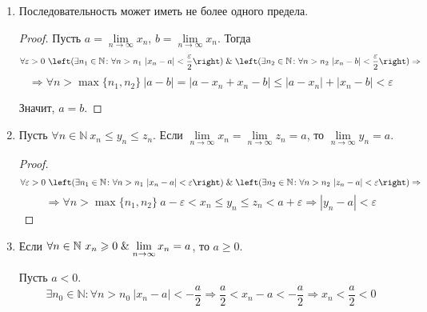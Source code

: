 \begin{enumerate}
	\item Последовательность может иметь не более одного предела.
	\begin{proof}
	Пусть $a = \lim\limits_{n \to \infty} x_n$, $b = \lim\limits_{n \to \infty} x_n$.
	Тогда
	\begin{equation*}
	\forall \varepsilon > 0 \
	\left( \exists n_1 \in \mathbb N \colon \forall n > n_1 \ |x_n - a| < \frac\varepsilon2 \right) \lAnd
	\left( \exists n_2 \in \mathbb N \colon \forall n > n_2 \ |x_n - b| < \frac\varepsilon2 \right) \Rightarrow
	\end{equation*}
	\begin{equation*}
	\Rightarrow \forall n > \max \{ n_1, n_2 \} \ |a - b| = |a - x_n + x_n - b| \leqslant |a - x_n| + |x_n - b| < \varepsilon
	\end{equation*}
	
	Значит, $a = b$.
	\end{proof}
	
	\item {}
	\begin{theorem}
	Пусть $\forall n \in \mathbb N \ x_n \leqslant y_n \leqslant z_n$.
	Если $\lim\limits_{n \to \infty} x_n = \lim\limits_{n \to \infty} z_n = a$, то $\lim\limits_{n \to \infty} y_n = a$.
	\end{theorem}
	\begin{proof}
	\begin{equation*}
	\forall \varepsilon > 0 \
	\left( \exists n_1 \in \mathbb N \colon \forall n > n_1 \ |x_n - a| < \varepsilon \right) \lAnd
	\left( \exists n_2 \in \mathbb N \colon \forall n > n_2 \ |z_n - a| < \varepsilon \right) \Rightarrow
	\end{equation*}
	\begin{equation*}
	\Rightarrow \forall n > \max \{ n_1, n_2 \} \ a - \varepsilon < x_n \leqslant y_n \leqslant z_n < a + \varepsilon \Rightarrow |y_n - a| < \varepsilon
	\end{equation*}
	\end{proof}
	
	\item Если $\forall n \in \mathbb N \ x_n \geqslant 0 \mathrel{\&} \lim\limits_{n \to \infty} x_n = a$, то $a \geqslant 0$.
	\begin{proofcontra}
	Пусть $a < 0$.
	\begin{equation*}
	\exists n_0 \in \mathbb N \colon \forall n > n_0 \ |x_n - a| < -\frac{a}2 \Rightarrow
	\frac{a}2 < x_n - a < -\frac{a}2 \Rightarrow
	x_n < \frac{a}2 < 0
	\end{equation*}
	

\end{proofcontra}
\end{enumerate}
